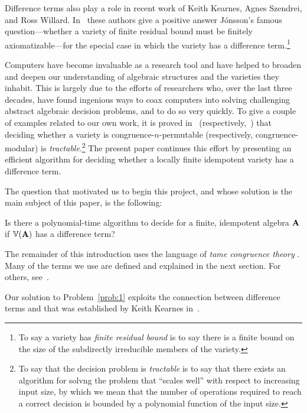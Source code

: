 Difference terms also play a role in recent work of Keith Kearnes,
Agnes Szendrei, and Ross Willard.
In~\cite{MR3449235} these authors give a positive answer
J\'onsson's famous question---whether a variety of finite
residual bound must be finitely
axiomatizable---for the
special case in which the variety has a difference
term.\footnote{To say a variety has \emph{finite residual bound} is to say
  there is a finite bound on the size of the subdirectly irreducible
  members of the variety.} 

Computers have become invaluable as a research tool and have helped to
broaden and deepen our understanding of algebraic structures and the
varieties they inhabit.  This is largely due to the efforts
of researchers who, over the last three decades, have found ingenious
ways to coax computers into solving challenging abstract algebraic
decision problems, and to do so very quickly.
To give a couple of examples related to our own work, 
it is proved in~\cite{MR3239624} (respectively,~\cite{Freese:2009})
that deciding whether a variety is congruence-$n$-permutable
(respectively, congruence-modular) is \emph{tractable}.\footnote{To
  say that the decision problem is \emph{tractable} is to say
  that there exists an algorithm for solvng the problem that ``scales
  well'' with respect to increasing input size, by which we mean that
  the number of operations required to reach a correct decision is
  bounded by a polynomial function of the input size.}
The present paper continues this effort by presenting an efficient
algorithm for deciding whether a locally finite idempotent variety has a
difference term.

The question that motivated us to begin this project, and
whose solution is the main subject of this paper, is the following:
\begin{prob}
  \label{prob:1}
  Is there a polynomial-time algorithm to decide for a finite,
  idempotent algebra $\mathbf{A}$ if $\operatorname{\mathbb{V}}(\mathbf{A})$ has a difference term?
\end{prob}
 
The remainder of this introduction uses the language of \emph{tame congruence theory} \tct.  Many of the terms we use are defined and explained
in the next section.  For others, see~\cite{HM:1988}.

Our solution to Problem~\ref{prob:1} exploits the connection 
between difference terms and \tct that was established  
by Keith Kearnes in~\cite{MR1358491}. 

